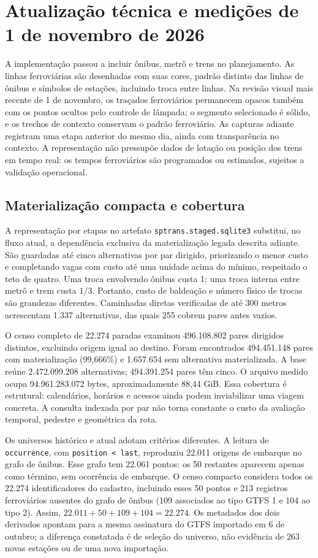 \section{Atualização técnica e medições de 1 de novembro de 2026}
\label{sec:atualizacao-20261101}
A implementação passou a incluir ônibus, metrô e trens no planejamento. As linhas ferroviárias são desenhadas com suas cores, padrão distinto das linhas de ônibus e símbolos de estações, incluindo troca entre linhas. Na revisão visual mais recente de 1 de novembro, os traçados ferroviários permanecem opacos também com os pontos ocultos pelo controle de lâmpada; o segmento selecionado é sólido, e os trechos de contexto conservam o padrão ferroviário. As capturas adiante registram uma etapa anterior do mesmo dia, ainda com transparência no contexto. A representação não pressupõe dados de lotação ou posição dos trens em tempo real: os tempos ferroviários são programados ou estimados, sujeitos a validação operacional.

\subsection{Materialização compacta e cobertura}
A representação por etapas no artefato \nolinkurl{sptrans.staged.sqlite3} substitui, no fluxo atual, a dependência exclusiva da materialização legada descrita adiante. São guardadas até cinco alternativas por par dirigido, priorizando o menor custo e completando vagas com custo até uma unidade acima do mínimo, respeitado o teto de quatro. Uma troca envolvendo ônibus custa 1; uma troca interna entre metrô e trem custa $1/3$. Portanto, custo de baldeação e número físico de trocas são grandezas diferentes. Caminhadas diretas verificadas de até 300 metros acrescentam 1.337 alternativas, das quais 255 cobrem pares antes vazios.

O censo completo de 22.274 paradas examinou 496.108.802 pares dirigidos distintos, excluindo origem igual ao destino. Foram encontrados 494.451.148 pares com materialização (99,666\%) e 1.657.654 sem alternativa materializada. A base reúne 2.472.099.208 alternativas; 494.391.254 pares têm cinco. O arquivo medido ocupa 94.961.283.072 bytes, aproximadamente 88,44 GiB. Essa cobertura é estrutural: calendários, horários e acessos ainda podem inviabilizar uma viagem concreta. A consulta indexada por par não torna constante o custo da avaliação temporal, pedestre e geométrica da rota.

Os universos histórico e atual adotam critérios diferentes. A leitura de \nolinkurl{occurrence}, com \texttt{position < last}, reproduziu 22.011 origens de embarque no grafo de ônibus. Esse grafo tem 22.061 pontos: os 50 restantes aparecem apenas como término, sem ocorrência de embarque. O censo compacto considera todos os 22.274 identificadores do cadastro, incluindo esses 50 pontos e 213 registros ferroviários ausentes do grafo de ônibus (109 associados ao tipo GTFS 1 e 104 ao tipo 2). Assim, $22.011+50+109+104=22.274$. Os metadados dos dois derivados apontam para a mesma assinatura do GTFS importado em 6 de outubro; a diferença constatada é de seleção do universo, não evidência de 263 novas estações ou de uma nova importação.

